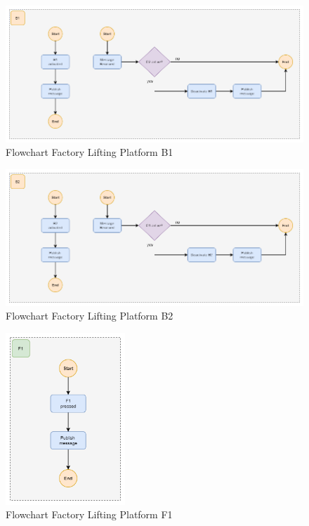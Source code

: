 \begin{figure}[H]
    \centering
    \includegraphics[width=1.0\textwidth]{images/flowchart_factory_lifter_b1.png}
    \caption{Flowchart Factory Lifting Platform B1}
    \label{fig:FlowChartFactoryLifterB1}
\end{figure}

\begin{figure}[H]
    \centering
    \includegraphics[width=1.0\textwidth]{images/flowchart_factory_lifter_b2.png}
    \caption{Flowchart Factory Lifting Platform B2}
    \label{fig:FlowChartFactoryLifterB2}
\end{figure}

\begin{figure}[H]
    \centering
    \includegraphics[width=0.4\textwidth]{images/flowchart_factory_lifter_f1.png}
    \caption{Flowchart Factory Lifting Platform F1}
    \label{fig:FlowChartFactoryLifterF1}
\end{figure}

